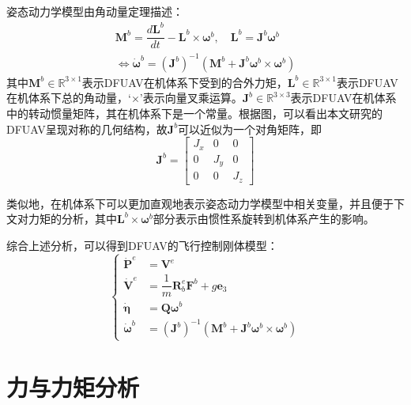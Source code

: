 姿态动力学模型由角动量定理描述：
\begin{equation}
    \begin{gathered}
    \boldsymbol{M}^{b}=\dfrac{d\boldsymbol{L}^{b}}{dt} - {\boldsymbol{L}^{b}}\times{\boldsymbol\omega^{b}},\quad \boldsymbol{L}^{b}=\boldsymbol{J}^{b}\boldsymbol\omega^{b}
    \\
    \Leftrightarrow\boldsymbol{\dot{\omega}}^b=(\boldsymbol{J}^b)^{-1}(\boldsymbol{M}^b+\boldsymbol{J}^b\boldsymbol{\omega}^b\times\boldsymbol{\omega}^b)
    \label{eq_8}
    \end{gathered}
\end{equation}
其中$\boldsymbol{M}^{b}\in\mathbb{R}^{3\times1}$表示DFUAV在机体系下受到的合外力矩，$\boldsymbol{L}^{b}\in\mathbb{R}^{3\times1}$表示DFUAV在机体系下总的角动量，‘$\times$’表示向量叉乘运算。$\boldsymbol{J}^{b}\in\mathbb{R}^{3\times3}$表示DFUAV在机体系中的转动惯量矩阵，其在机体系下是一个常量。根据图，可以看出本文研究的DFUAV呈现对称的几何结构，故$\boldsymbol{J}^{b}$可以近似为一个对角矩阵，即
\begin{equation}
    \boldsymbol{J}^b=\begin{bmatrix}
        J_{x} & 0 & 0 \\
        0 & J_{y} & 0 \\
        0 & 0 & J_{z}
        \end{bmatrix}
    \label{eq_9}
\end{equation}

类似地，在机体系下可以更加直观地表示姿态动力学模型中相关变量，并且便于下文对力矩的分析，其中${\boldsymbol{L}^{b}}\times{\boldsymbol\omega^{b}}$部分表示由惯性系旋转到机体系产生的影响。

综合上述分析，可以得到DFUAV的飞行控制刚体模型：
\begin{equation}
    \left\{
    \begin{aligned}
        \boldsymbol{\dot{P}}^{e} &= \boldsymbol{V}^{e} \\
        \dot{\boldsymbol{V}}^e&=\dfrac{1}{m}\boldsymbol{R}_b^e\boldsymbol{F}^b + g\boldsymbol{e}_3 \\
        \dot{\boldsymbol{\eta}}&=\boldsymbol{Q}\boldsymbol{\omega}^b \\
        \boldsymbol{\dot{\omega}}^b&=(\boldsymbol{J}^b)^{-1}(\boldsymbol{M}^b+\boldsymbol{J}^b\boldsymbol{\omega}^b\times\boldsymbol{\omega}^b)
    \end{aligned}
    \right.
    \label{eq_10}
\end{equation}

\section{力与力矩分析}

